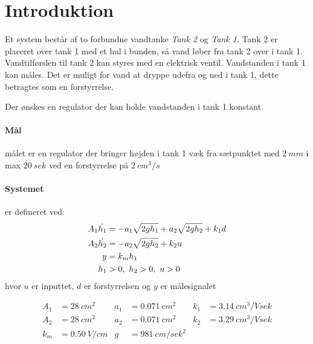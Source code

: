 \section{Introduktion}
Et system består af to forbundne vandtanke \emph{Tank 2} og \emph{Tank 1}. Tank
2 er placeret over tank 1 med et hul i bunden, så vand løber fra tank 2 over i
tank 1. Vandtilførslen til tank 2 kan styres med en elektrisk ventil.
Vandstanden i tank 1 kan måles.
Det er muligt for vand at dryppe udefra og ned i tank 1, dette betragtes som en
forstyrrelse.

Der ønskes en regulator der kan holde vandstanden i tank 1 konstant.

\paragraph*{Mål}
målet er en regulator der bringer højden i tank 1 væk fra sætpunktet
med $2~mm$ i max $20~sek$ ved en forstyrrelse på $2~cm^3/s$

\paragraph*{Systemet}
er defineret ved:
\begin{align*}
A_1 \dot{h_1} &= -a_1\sqrt{2gh_1} + a_2\sqrt{2gh_2} + k_1d\\
A_2 \dot{h_2} &= -a_2\sqrt{2gh_2} + k_2u\\
y &= k_mh_1\\
h_1 &> 0,~h_2 > 0,~u>0
\end{align*}
hvor $u$ er inputtet, $d$ er forstyrrelsen og $y$ er målesignalet

\begin{align*}
A_1 &= 28~cm^2 & a_1 &= 0.071~cm^2 & k_1 &= 3.14~cm^3/V sek\\
A_2 &= 28~cm^2 & a_2 &= 0.071~cm^2 & k_2 &= 3.29~cm^3/V sek\\
k_m &= 0.50~V/cm & g &= 981~cm/sek^2
\end{align*}